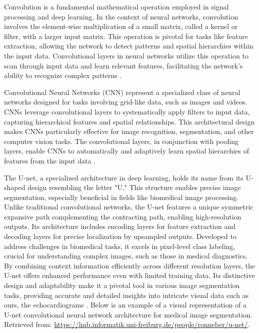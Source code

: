 \documentclass[runningheads]{llncs}
\begin{document}
Convolution is a fundamental mathematical operation employed in signal processing and deep learning. In the context of neural networks, convolution involves the element-wise multiplication of a small matrix, called a kernel or filter, with a larger input matrix. This operation is pivotal for tasks like feature extraction, allowing the network to detect patterns and spatial hierarchies within the input data. Convolutional layers in neural networks utilize this operation to scan through input data and learn relevant features, facilitating the network's ability to recognize complex patterns \cite{b}.

Convolutional Neural Networks (CNN) represent a specialized class of neural networks designed for tasks involving grid-like data, such as images and videos. CNNs leverage convolutional layers to systematically apply filters to input data, capturing hierarchical features and spatial relationships. This architectural design makes CNNs particularly effective for image recognition, segmentation, and other computer vision tasks. The convolutional layers, in conjunction with pooling layers, enable CNNs to automatically and adaptively learn spatial hierarchies of features from the input data \cite{c}.

The U-net, a specialized architecture in deep learning, holds its name from its U-shaped design resembling the letter "U." This structure enables precise image segmentation, especially beneficial in fields like biomedical image processing. Unlike traditional convolutional networks, the U-net features a unique symmetric expansive path complementing the contracting path, enabling high-resolution outputs. Its architecture includes encoding layers for feature extraction and decoding layers for precise localization by upsampled outputs. Developed to address challenges in biomedical tasks, it excels in pixel-level class labeling, crucial for understanding complex images, such as those in medical diagnostics. By combining context information efficiently across different resolution layers, the U-net offers enhanced performance even with limited training data. Its distinctive design and adaptability make it a pivotal tool in various image segmentation tasks, providing accurate and detailed insights into intricate visual data such as ours, the echocardiograms \cite{unet}.
Below is an example of a visual representation of a U-net convolutional neural network architecture for medical image segmentation. Retrieved from: \url{https://lmb.informatik.uni-freiburg.de/people/ronneber/u-net/}.
\end{document}
